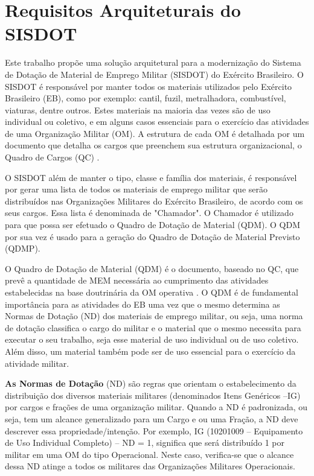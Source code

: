 \section{Requisitos Arquiteturais do SISDOT}\label{sec:requirements}

Este trabalho propõe uma solução arquitetural para a modernização do Sistema de Dotação de Material de Emprego Militar (SISDOT) do Exército Brasileiro. O SISDOT é responsável por manter todos os materiais utilizados pelo Exército Brasileiro (EB), como por exemplo: cantil, fuzil, metralhadora, combustível, viaturas, dentre outros. Estes materiais na maioria das vezes são de uso individual ou coletivo, e em alguns casos essenciais para o exercício das atividades de uma Organização Militar (OM). A estrutura de cada OM é detalhada por um documento que detalha os cargos que preenchem sua estrutura organizacional, o Quadro de Cargos (QC) \cite{brasil2015}.

O SISDOT além de manter o tipo, classe e família dos materiais, é responsável por gerar uma lista de todos os materiais de emprego militar que serão distribuídos nas Organizações Militares do Exército Brasileiro, de acordo com os seus cargos. Essa lista é denominada de "Chamador". O Chamador é utilizado para que possa ser efetuado o Quadro de Dotação de Material (QDM). O QDM por sua vez é usado para a geração do Quadro de Dotação de Material Previsto (QDMP). 

O Quadro de Dotação de Material (QDM) é o documento, baseado no QC, que prevê a quantidade de MEM necessária ao cumprimento das atividades estabelecidas na base doutrinária da OM operativa \cite{brasil2015}. O QDM é de fundamental importância para as atividades do EB uma vez que o mesmo determina as Normas de Dotação (ND) dos materiais de emprego militar, ou seja, uma norma de dotação classifica o cargo do militar e o material que o mesmo necessita para executar o seu trabalho, seja esse material de uso individual ou de uso coletivo. Além disso, um material também pode ser de uso essencial para o exercício da atividade militar.

\textbf{As Normas de Dotação} (ND) são regras que orientam o estabelecimento da distribuição dos diversos materiais militares (denominados Itens Genéricos --IG) por cargos e frações de uma organização militar. Quando a ND é padronizada, ou seja, tem um alcance generalizado para um Cargo e ou uma Fração, a ND deve descrever essa propriedade/intenção. Por exemplo, IG (10201009 -- Equipamento de Uso Individual Completo) -- ND = 1, significa que será distribuído 1 por militar em uma OM do tipo Operacional. Neste caso, verifica-se que o alcance dessa ND atinge a todos os militares das Organizações Militares Operacionais.

